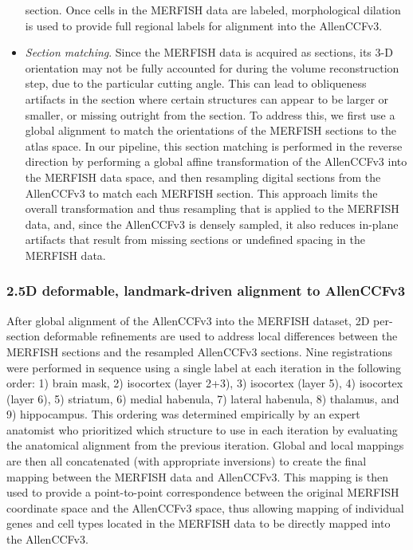\documentclass[
  12pt,
]{article}
\begin{document}
\begin{itemize}
  section. Once cells in the MERFISH data are labeled, morphological
  dilation is used to provide full regional labels for alignment into
  the AllenCCFv3.
\item
  \emph{Section matching}. Since the MERFISH data is acquired as
  sections, its 3-D orientation may not be fully accounted for during
  the volume reconstruction step, due to the particular cutting angle.
  This can lead to obliqueness artifacts in the section where certain
  structures can appear to be larger or smaller, or missing outright
  from the section. To address this, we first use a global alignment to
  match the orientations of the MERFISH sections to the atlas space. In
  our pipeline, this section matching is performed in the reverse
  direction by performing a global affine transformation of the
  AllenCCFv3 into the MERFISH data space, and then resampling digital
  sections from the AllenCCFv3 to match each MERFISH section. This
  approach limits the overall transformation and thus resampling that is
  applied to the MERFISH data, and, since the AllenCCFv3 is densely
  sampled, it also reduces in-plane artifacts that result from missing
  sections or undefined spacing in the MERFISH data.
\end{itemize}

\subsubsection{2.5D deformable, landmark-driven alignment to
AllenCCFv3}\label{d-deformable-landmark-driven-alignment-to-allenccfv3}

After global alignment of the AllenCCFv3 into the MERFISH dataset, 2D
per-section deformable refinements are used to address local differences
between the MERFISH sections and the resampled AllenCCFv3 sections. Nine
registrations were performed in sequence using a single label at each
iteration in the following order: 1) brain mask, 2) isocortex (layer
2+3), 3) isocortex (layer 5), 4) isocortex (layer 6), 5) striatum, 6)
medial habenula, 7) lateral habenula, 8) thalamus, and 9) hippocampus.
This ordering was determined empirically by an expert anatomist who
prioritized which structure to use in each iteration by evaluating the
anatomical alignment from the previous iteration. Global and local
mappings are then all concatenated (with appropriate inversions) to
create the final mapping between the MERFISH data and AllenCCFv3. This
mapping is then used to provide a point-to-point correspondence between
the original MERFISH coordinate space and the AllenCCFv3 space, thus
allowing mapping of individual genes and cell types located in the
MERFISH data to be directly mapped into the AllenCCFv3.
\end{document}
